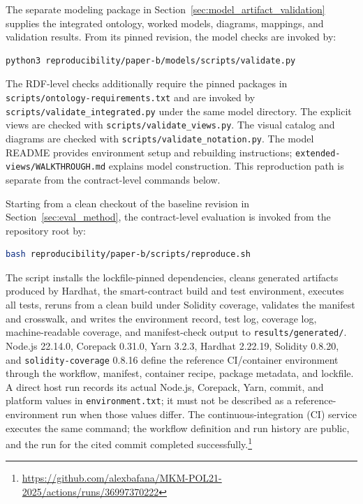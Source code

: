\documentclass[journal]{IEEEtran}
\begin{document}
The separate modeling package in
Section~\ref{sec:model_artifact_validation} supplies the
integrated ontology, worked models, diagrams, mappings, and
validation results. From its pinned revision, the model checks
are invoked by:
\begin{verbatim}
python3 reproducibility/paper-b/models/scripts/validate.py
\end{verbatim}
The RDF-level checks additionally require the pinned packages
in \texttt{scripts/ontology-requirements.txt} and are invoked by
\texttt{scripts/validate\_integrated.py} under the same model
directory. The explicit views are checked with
\texttt{scripts/validate\_views.py}. The visual catalog and diagrams are checked with
\texttt{scripts/validate\_notation.py}. The model README provides
environment setup and rebuilding instructions;
\texttt{extended-views/WALKTHROUGH.md} explains model construction. This reproduction path is separate
from the contract-level commands below.

Starting from a clean checkout of the baseline revision in
Section~\ref{sec:eval_method}, the contract-level evaluation
is invoked from the repository root by:
\begin{lstlisting}[language=bash,caption={One-command reproduction of the baseline evaluation evidence},label={lst:reproduce}]
bash reproducibility/paper-b/scripts/reproduce.sh
\end{lstlisting}
The script installs the lockfile-pinned dependencies, cleans generated
artifacts produced by Hardhat, the smart-contract build and test environment,
executes all tests, reruns from a clean build under
Solidity coverage, validates the manifest and crosswalk, and writes the
environment record, test log, coverage log, machine-readable coverage, and
manifest-check output to \texttt{results/generated/}. Node.js 22.14.0,
Corepack 0.31.0, Yarn 3.2.3, Hardhat 2.22.19, Solidity 0.8.20, and
\texttt{solidity-coverage} 0.8.16 define the reference CI/container
environment through the workflow, manifest, container recipe, package
metadata, and lockfile. A direct host run records its actual Node.js, Corepack,
Yarn, commit, and platform values in \texttt{environment.txt}; it must not be
described as a reference-environment run when those values differ. The
continuous-integration (CI) service executes the same command;
the workflow definition and run
history are public, and the run for the cited commit completed
successfully.\footnote{\url{https://github.com/alexbafana/MKM-POL21-2025/actions/runs/36997370222}}
\end{document}
